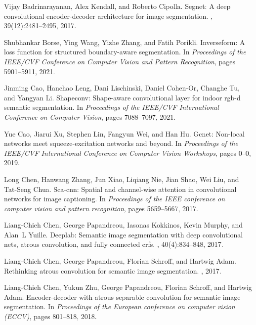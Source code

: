 \documentclass[10pt,twocolumn,letterpaper]{article}
\begin{document}
\begin{thebibliography}{10}\itemsep=-1pt

Vijay Badrinarayanan, Alex Kendall, and Roberto Cipolla.
\newblock Segnet: A deep convolutional encoder-decoder architecture for image
  segmentation.
,
  39(12):2481--2495, 2017.

Shubhankar Borse, Ying Wang, Yizhe Zhang, and Fatih Porikli.
\newblock Inverseform: A loss function for structured boundary-aware
  segmentation.
\newblock In {\em Proceedings of the IEEE/CVF Conference on Computer Vision and
  Pattern Recognition}, pages 5901--5911, 2021.

Jinming Cao, Hanchao Leng, Dani Lischinski, Daniel Cohen-Or, Changhe Tu, and
  Yangyan Li.
\newblock Shapeconv: Shape-aware convolutional layer for indoor rgb-d semantic
  segmentation.
\newblock In {\em Proceedings of the IEEE/CVF International Conference on
  Computer Vision}, pages 7088--7097, 2021.

Yue Cao, Jiarui Xu, Stephen Lin, Fangyun Wei, and Han Hu.
\newblock Gcnet: Non-local networks meet squeeze-excitation networks and
  beyond.
\newblock In {\em Proceedings of the IEEE/CVF International Conference on
  Computer Vision Workshops}, pages 0--0, 2019.

Long Chen, Hanwang Zhang, Jun Xiao, Liqiang Nie, Jian Shao, Wei Liu, and
  Tat-Seng Chua.
\newblock Sca-cnn: Spatial and channel-wise attention in convolutional networks
  for image captioning.
\newblock In {\em Proceedings of the IEEE conference on computer vision and
  pattern recognition}, pages 5659--5667, 2017.

Liang-Chieh Chen, George Papandreou, Iasonas Kokkinos, Kevin Murphy, and Alan~L
  Yuille.
\newblock Deeplab: Semantic image segmentation with deep convolutional nets,
  atrous convolution, and fully connected crfs.
,
  40(4):834--848, 2017.

Liang-Chieh Chen, George Papandreou, Florian Schroff, and Hartwig Adam.
\newblock Rethinking atrous convolution for semantic image segmentation.
, 2017.

Liang-Chieh Chen, Yukun Zhu, George Papandreou, Florian Schroff, and Hartwig
  Adam.
\newblock Encoder-decoder with atrous separable convolution for semantic image
  segmentation.
\newblock In {\em Proceedings of the European conference on computer vision
  (ECCV)}, pages 801--818, 2018.


\end{thebibliography}
\end{document}
